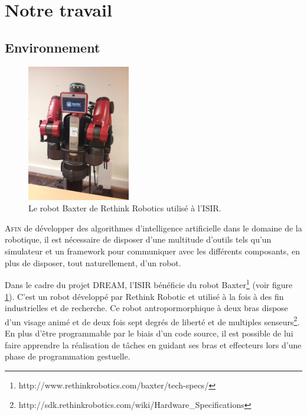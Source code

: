 \documentclass[draft]{llncs}
\begin{document}
\section{Notre travail}


\subsection{Environnement}

\begin{figure}
  \begin{center}
    \includegraphics[angle=-90, width=0.4\textwidth]{figures/baxter}
  \end{center}
  \caption{Le robot Baxter de Rethink Robotics utilisé à l'ISIR.}
  \label{fig:baxter}
\end{figure}

\lettrine{A}{fin} de développer des algorithmes d'intelligence artificielle dans le domaine de la robotique, il est nécessaire de disposer d'une multitude d'outils tels qu'un simulateur et un framework pour communiquer avec les différents composants, en plus de disposer, tout naturellement, d'un robot.


Dans le cadre du projet DREAM, l'ISIR bénéficie du robot Baxter\footnote{http://www.rethinkrobotics.com/baxter/tech-specs/} (voir figure \ref{fig:baxter}).
C'est un robot développé par Rethink Robotic et utilisé à la fois à des fin industrielles et de recherche.
Ce robot antropormorphique à deux bras dispose d'un \og{}visage animé\fg{} et de deux fois sept degrés de liberté et de multiples senseurs\footnote{http://sdk.rethinkrobotics.com/wiki/Hardware\_Specifications}.
En plus d'être programmable par le biais d'un code source, il est possible de lui faire apprendre la réalisation de tâches en guidant ses bras et effecteurs lors d'une phase de programmation gestuelle.
\end{document}
